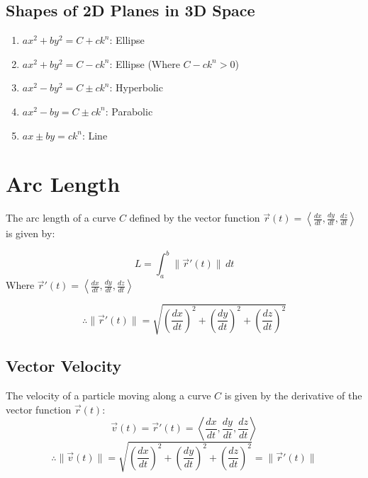 \documentclass{article}
\begin{document}
\subsection{Shapes of 2D Planes in 3D Space}
\begin{center}
\begin{enumerate}
    \item $ax^2 + by^2 = C + ck^n$: Ellipse
    \item $ax^2 + by^2 = C - ck^n$: Ellipse (Where $C - ck^n > 0$)
    \item $ax^2 - by^2 = C \pm ck^n$: Hyperbolic
    \item $ax^2 - by = C \pm ck^n$: Parabolic
    \item $ax \pm by = ck^n$: Line
\end{enumerate}
\end{center}

\newpage

\section{Arc Length}
The arc length of a curve $C$ defined by the vector function $\vec{r}(t) = \left\langle \frac{dx}{dt}, \frac{dy}{dt}, \frac{dz}{dt} \right\rangle$ is given by:

\begin{equation}
    L = \int_{a}^{b} \lVert \vec{r}'(t) \rVert \, dt 
\end{equation}
Where $\vec{r}'(t) = \left\langle \frac{dx}{dt}, \frac{dy}{dt}, \frac{dz}{dt} \right\rangle$

\begin{equation}
    \therefore \lVert \vec{r}'(t) \rVert = \sqrt{\left(\frac{dx}{dt}\right)^2 + \left(\frac{dy}{dt}\right)^2 + \left(\frac{dz}{dt}\right)^2}
\end{equation}
\subsection{Vector Velocity}
The velocity of a particle moving along a curve $C$ is given by the derivative of the vector function $\vec{r}(t)$:
\begin{equation}
    \vec{v}(t) = \vec{r}'(t) = \left\langle \frac{dx}{dt}, \frac{dy}{dt}, \frac{dz}{dt} \right\rangle
\end{equation}
\begin{equation}
    \therefore \lVert \vec{v}(t) \rVert = \sqrt{\left(\frac{dx}{dt}\right)^2 + \left(\frac{dy}{dt}\right)^2 + \left(\frac{dz}{dt}\right)^2} = \lVert \vec{r}'(t) \rVert
\end{equation}\\
\newline
\end{document}
